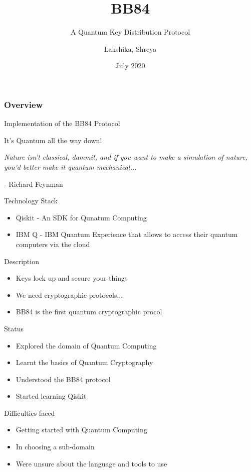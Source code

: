 \documentclass[14 pt]{beamer}
\title[BB84]{BB84}
\subtitle{A Quantum Key Distribution Protocol}
\author[Team 37]{Lakshika, Shreya}
\date{July 2020}
\begin{document}
\begin{frame}
	\titlepage
\end{frame}

\begin{frame}
	\frametitle{Overview}
	 Implementation of the BB84 Protocol
\end{frame}


\begin{frame}{It's Quantum all the way down!}
    \begin{center}
        \emph{Nature isn’t classical, dammit, and if you want to make a simulation of nature, you’d better make it quantum mechanical...}
    \end{center}
    \begin{flushright}
        - Richard Feynman
    \end{flushright}
\end{frame}


\begin{frame}{Technology Stack}
	\begin{itemize}
		\item Qiskit - An SDK for Qunatum Computing
		\item IBM Q - IBM Quantum Experience that allows to access their quantum computers via the cloud
	\end{itemize}
\end{frame}

\begin{frame}{Description}
    \begin{itemize}[<+->] 
        \item Keys lock up and secure your things
        \item We need cryptographic protocols...
        \item BB84 is the first quantum cryptographic procol
    \end{itemize}
\end{frame}

\begin{frame}{Status}
	\begin{itemize}
		\item Explored the domain of Quantum Computing
        \item Learnt the basics of Quantum Cryptography
        \item Understood the BB84 protocol
        \item Started learning Qiskit
	\end{itemize}
\end{frame}

\begin{frame}{Difficulties faced}
	\begin{itemize}
		\item Getting started with Quantum Computing
        \item In choosing a sub-domain
        \item Were unsure about the language and tools to use
	\end{itemize}
\end{frame}
		
\end{document}
